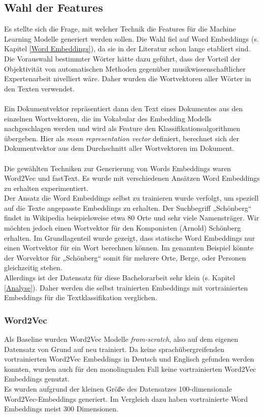 \documentclass[ngerman]{ttlab-qualify}
\begin{document}
\subsection{Wahl der Features}
Es stellte sich die Frage, mit welcher Technik die Features für die Machine Learning Modelle generiert werden sollen. Die Wahl fiel auf Word Embeddings (s. Kapitel \ref{Word Embeddings}), da sie in der Literatur schon lange etabliert sind. Die Vorauswahl bestimmter Wörter hätte dazu geführt, dass der Vorteil der Objektivität von automatischen Methoden gegenüber musikwissenschaftlicher Expertenarbeit nivelliert wäre. Daher wurden die Wortvektoren aller Wörter in den Texten verwendet.\\
\\
Ein Dokumentvektor repräsentiert dann den Text eines Dokumentes aus den einzelnen Wortvektoren, die im Vokabular des Embedding Modells nachgeschlagen werden und wird als Feature den Klassifikationsalgorithmen übergeben. Hier als \textit{mean representation vector} definiert, berechnet sich der Dokumentvektor aus dem Durchschnitt aller Wortvektoren im Dokument.\\
\\
Die gewählten Techniken zur Generierung von Words Embeddings waren Word2Vec und fastText. Es wurde mit verschiedenen Ansätzen Word Embeddings zu erhalten experimentiert.\\
Der Ansatz die Word Embeddings selbst zu trainieren wurde verfolgt, um speziell auf die Texte angepasste Embeddings zu erhalten. Der Suchbegriff „Schönberg“ findet in Wikipedia beispielsweise etwa 80 Orte und sehr viele Namensträger. Wir möchten jedoch einen Wortvektor für den Komponisten (Arnold) Schönberg erhalten. Im Grundlagenteil wurde gezeigt, dass statische Word Embeddings nur einen Wortvektor für ein Wort berechnen können. Im genannten Beispiel könnte der Worvektor für „Schönberg“ somit für mehrere Orte, Berge, oder Personen gleichzeitig stehen.\\
Allerdings ist der Datensatz für diese Bachelorarbeit sehr klein (s. Kapitel \ref{Analyse}). Daher werden die selbst trainierten Embeddings mit vortrainierten Embeddings für die Textklassifikation verglichen.
\subsubsection{Word2Vec}
Als Baseline wurden Word2Vec Modelle \textit{from-scratch}, also auf dem eigenen Datensatz von Grund auf neu trainiert. Da keine sprachübergreifenden vortrainierten Word2Vec Embeddings in Deutsch und Englisch gefunden werden konnten, wurden auch für den monolingualen Fall keine vortrainierten Word2Vec Embeddings genutzt.\\
Es wurden aufgrund der kleinen Größe des Datensatzes 100-dimensionale Word2Vec-Embeddings generiert. Im Vergleich dazu haben vortrainierte Word Embeddings meist 300 Dimensionen.
\end{document}
